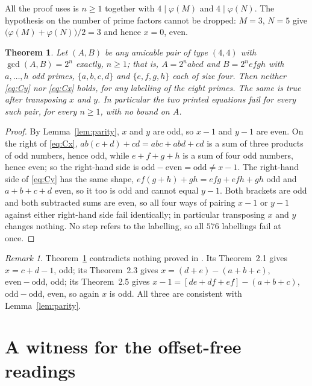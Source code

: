 \documentclass[11pt]{amsart}
\newtheorem{theorem}{Theorem}
\theoremstyle{remark}
\newtheorem*{remark}{Remark}
\begin{document}
All the proof uses is $n\ge1$ together with $4\mid\varphi(M)$ and
$4\mid\varphi(N)$. The hypothesis on the number of prime factors cannot be
dropped: $M=3$, $N=5$ give $\bigl(\varphi(M)+\varphi(N)\bigr)/2=3$ and hence
$x=0$, even.

\begin{theorem}\label{thm:main}
Let $(A,B)$ be any amicable pair of type $(4,4)$ with $\gcd(A,B)=2^n$ exactly,
$n\ge1$; that is, $A=2^nabcd$ and $B=2^nefgh$ with $a,\dots,h$ odd primes,
$\{a,b,c,d\}$ and $\{e,f,g,h\}$ each of size four. Then neither \eqref{eq:Cy}
nor \eqref{eq:Cx} holds, for any labelling of the eight primes. The same is
true after transposing $x$ and $y$. In particular the two printed equations fail
for every such pair, for every $n\ge1$, with no bound on $A$.
\end{theorem}

\begin{proof}
By Lemma~\ref{lem:parity}, $x$ and $y$ are odd, so $x-1$ and $y-1$ are even. On
the right of \eqref{eq:Cx}, $ab(c+d)+cd=abc+abd+cd$ is a sum of three products
of odd numbers, hence odd, while $e+f+g+h$ is a sum of four odd numbers, hence
even; so the right-hand side is $\mathrm{odd}-\mathrm{even}=\mathrm{odd}\neq
x-1$. The right-hand side of \eqref{eq:Cy} has the same shape,
$ef(g+h)+gh=efg+efh+gh$ odd and $a+b+c+d$ even, so it too is odd and cannot
equal $y-1$. Both brackets are odd and both subtracted sums are even, so all
four ways of pairing $x-1$ or $y-1$ against either right-hand side fail
identically; in particular transposing $x$ and $y$ changes nothing. No step
refers to the labelling, so all $576$ labellings fail at once.
\end{proof}

\begin{remark}
Theorem~\ref{thm:main} contradicts nothing proved in \cite{MA}. Its
Theorem~2.1 gives $x=c+d-1$, odd; its Theorem~2.3 gives $x=(d+e)-(a+b+c)$,
$\mathrm{even}-\mathrm{odd}$, odd; its Theorem~2.5 gives
$x-1=[de+df+ef]-(a+b+c)$, $\mathrm{odd}-\mathrm{odd}$, even, so again $x$ is
odd. All three are consistent with Lemma~\ref{lem:parity}.
\end{remark}

\section{A witness for the offset-free readings}
\end{document}
